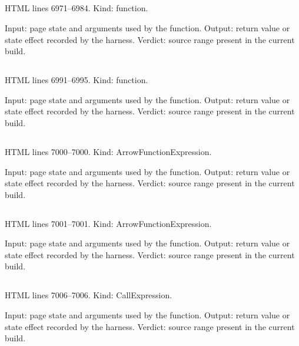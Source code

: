 \subsection*{\texttt{}}
\label{vf_337_effSliwinProxy}
HTML lines 6971--6984. Kind: function.

Input: page state and arguments used by the function.
Output: return value or state effect recorded by the harness.
Verdict: source range present in the current build.

\subsection*{\texttt{}}
\label{vf_338_efficiencyFromSlope}
HTML lines 6991--6995. Kind: function.

Input: page state and arguments used by the function.
Output: return value or state effect recorded by the harness.
Verdict: source range present in the current build.

\subsection*{\texttt{\detokenize{$}}}
\label{vf_339__}
HTML lines 7000--7000. Kind: ArrowFunctionExpression.

Input: page state and arguments used by the function.
Output: return value or state effect recorded by the harness.
Verdict: source range present in the current build.

\subsection*{\texttt{\detokenize{$$}}}
\label{vf_340__}
HTML lines 7001--7001. Kind: ArrowFunctionExpression.

Input: page state and arguments used by the function.
Output: return value or state effect recorded by the harness.
Verdict: source range present in the current build.

\subsection*{\texttt{}}
\label{vf_341_APP_LIMITS}
HTML lines 7006--7006. Kind: CallExpression.

Input: page state and arguments used by the function.
Output: return value or state effect recorded by the harness.
Verdict: source range present in the current build.

